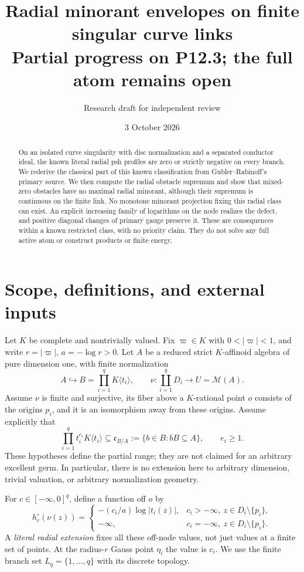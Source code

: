\documentclass[11pt]{article}
\title{Radial minorant envelopes on finite singular curve links\\
\large Partial progress on P12.3; the full atom remains open}
\author{Research draft for independent review}
\date{3 October 2026}
\theoremstyle{definition}
\begin{document}
\maketitle
\begin{abstract}
On an isolated curve singularity with disc normalization and a separated
conductor ideal, the known literal radial psh profiles are zero or strictly
negative on every branch. We rederive the classical part of this known
classification from Gubler--Rabinoff's primary source. We then compute the
radial obstacle supremum and show that mixed-zero obstacles have no maximal
radial minorant, although their supremum is continuous on the finite link.
No monotone minorant projection fixing this radial class can exist. An
explicit increasing family of logarithms on the node realizes the defect,
and positive diagonal changes of primary gauge preserve it. These are
consequences within a known restricted class, with no priority claim. They
do not solve any full active atom or construct products or finite energy.
\end{abstract}

\section{Scope, definitions, and external inputs}
Let $K$ be complete and nontrivially valued. Fix $\varpi\in K$ with
$0<|\varpi|<1$, and write $r=|\varpi|$, $a=-\log r>0$.
Let $A$ be a reduced strict $K$-affinoid algebra of pure dimension one,
with finite normalization
\[
 A\hookrightarrow B=\prod_{i=1}^qK\langle t_i\rangle,
 \qquad \nu:\coprod_{i=1}^q D_i\longrightarrow U=\mathcal M(A).
\]
Assume $\nu$ is finite and surjective, its fiber above a $K$-rational
point $o$ consists of the origins $p_i$, and it is an isomorphism away
from these origins. Assume explicitly that
\[
 \prod_{i=1}^qt_i^{e_i}K\langle t_i\rangle
 \subseteq \mathfrak c_{B/A}:=\{b\in B:bB\subseteq A\},
 \qquad e_i\geq1.
\]
These hypotheses define the partial range; they are not claimed for an
arbitrary excellent germ. In particular, there is no extension here to
arbitrary dimension, trivial valuation, or arbitrary normalization geometry.

For $c\in[-\infty,0]^q$, define a function off $o$ by
\[
 h_c^\circ(\nu(z))=
 \begin{cases}
  -(c_i/a)\log|t_i(z)|,&c_i> -\infty,\ z\in D_i\setminus\{p_i\},\\
  -\infty,&c_i=-\infty,\ z\in D_i\setminus\{p_i\}.
 \end{cases}
\]
A \emph{literal radial extension} fixes all these off-node values, not
just values at a finite set of points. At the radius-$r$ Gauss point
$\eta_i$ the value is $c_i$. We use the finite branch set
$L_q=\{1,\ldots,q\}$ with its discrete topology.
\end{document}
